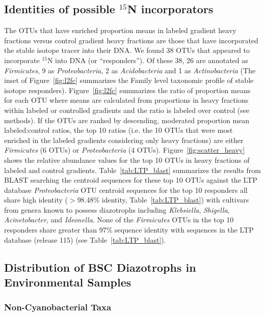 \subsection{Identities of possible $^{15}$N incorporators} The OTUs that have
enriched proportion means in labeled gradient heavy fractions versus control
gradient heavy fractions are those that have incorporated the stable isotope
tracer into their DNA. We found 38 OTUs that appeared to incorporate $^{15}$N
into DNA (or ``responders''). Of these 38, 26 are annotated as
\textit{Firmicutes}, 9 as \textit{Proteobacteria}, 2 as
\textit{Acidobacteria} and 1 as \textit{Actinobacteria} (The inset of
Figure~\ref{fig:l2fc} summarizes the Family level taxonomic profile of stable
isotope responders).  Figure~\ref{fig:l2fc} summarizes the ratio of
proportion means for each OTU where means are calculated from proportions in
heavy fractions within labeled or controlled gradients and the ratio is
labeled over control (see methods). If the OTUs are ranked by descending,
moderated proportion mean labeled:control ratios, the top 10 ratios (i.e. the
10 OTUs that were most enriched in the labeled gradients considering only
heavy fractions) are either \textit{Firmicutes} (6 OTUs) or
\textit{Proteobacteria} (4 OTUs).  Figure~\ref{fig:scatter_heavy} shows the
relative abundance values for the top 10 OTUs in heavy fractions of labeled
and control gradients.  Table~\ref{tab:LTP_blast} summarizes the results from
BLAST searching the centroid sequences for these top 10 OTUs against the LTP
database \textit{Proteobacteria} OTU centroid sequences for the top 10
responders all share high identity ($>$98.48\% identity,
Table~\ref{tab:LTP_blast}) with cultivars from genera known to possess
diazotrophs including \textit{Klebsiella}, \textit{Shigella},
\textit{Acinetobacter}, and \textit{Ideonella}. None of the
\textit{Firmicutes} OTUs in the top 10 responders share greater than 97\%
sequence identity with sequences in the LTP database (release 115) (see
Table~\ref{tab:LTP_blast}).

\subsection{Distribution of BSC Diazotrophs in Environmental Samples}
\subsubsection{Non-Cyanobacterial Taxa}
